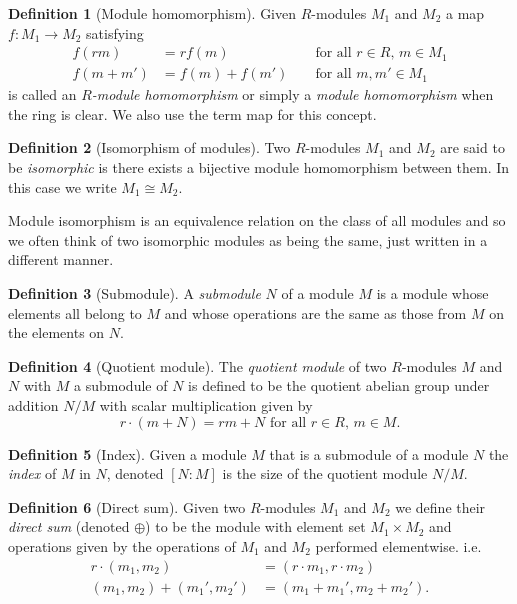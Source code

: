 \documentclass[a4paper,abstracton,bibtotoc]{scrreprt}
\theoremstyle{definition}
\newtheorem{defn}{Definition}
\begin{document}
\begin{defn}[Module homomorphism]
Given $R$-modules $M_1$ and $M_2$ a map $f\colon M_1 \to M_2$ satisfying
\begin{align*}
f(rm) &= rf(m) &&\text{ for all $r\in R$, $m\in M_1$}\\
f(m + m') &= f(m) + f(m')&&\text{ for all $m,m'\in M_1$}
\end{align*}
is called an \emph{$R$-module homomorphism} or simply a \emph{module homomorphism} when the ring is clear.
We also use the term map for this concept.
\end{defn}

\begin{defn}[Isomorphism of modules]
Two $R$-modules $M_1$ and $M_2$ are said to be \emph{isomorphic} is there exists a bijective module homomorphism between them. 
In this case we write $M_1\cong M_2$.
\end{defn}

Module isomorphism is an equivalence relation on the class of all modules and so we often think of two isomorphic modules as being the same, just written in a different manner.

\begin{defn}[Submodule]
A \emph{submodule} $N$ of a module $M$ is a module whose elements all belong to $M$ and whose operations are the same as those from $M$ on the elements on $N$.
\end{defn}

\begin{defn}[Quotient module]
The \emph{quotient module} of two $R$-modules $M$ and $N$ with $M$ a submodule of $N$ is defined to be the quotient abelian group under addition $N/
M$ with scalar multiplication given by
\[
r\cdot(m + N) = rm + N\text{ for all $r\in R$, $m\in M$}.
\]
\end{defn}

\begin{defn}[Index]
Given a module $M$ that is a submodule of a module $N$ the \emph{index} of $M$ in $N$, denoted $[N:M]$ is the size of the quotient module $N / M$.
\end{defn}

\begin{defn}[Direct sum]
Given two $R$-modules $M_1$ and $M_2$ we define their \emph{direct sum} (denoted $\oplus$) to be the module with element set $M_1 \times M_2$ and operations given by the operations of $M_1$ and $M_2$ performed elementwise. i.e.
\begin{align*}
r\cdot(m_1,m_2) &= (r\cdot m_1, r\cdot m_2)\\
(m_1,m_2) + (m_1',m_2') &= (m_1 + m_1',m_2+m_2').
\end{align*}
\end{defn}
\end{document}
